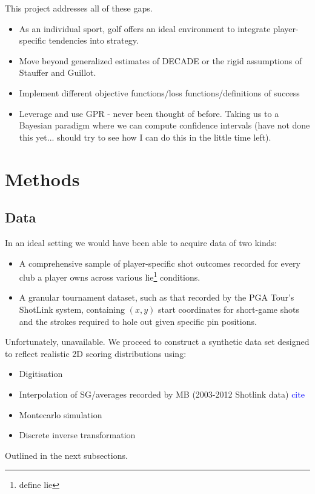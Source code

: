 \documentclass[11pt, letterpaper]{article}
\begin{document}
This project addresses all of these gaps.
\begin{itemize}
    \item As an individual sport, golf offers an ideal environment to integrate player-specific tendencies into strategy.
    \item Move beyond generalized estimates of DECADE or the rigid assumptions of Stauffer and Guillot.
    \item Implement different objective functions/loss functions/definitions of success
    \item Leverage and use GPR - never been thought of before. Taking us to a Bayesian paradigm where we can compute confidence intervals (have not done this yet... should try to see how I can do this in the little time left).
    
\end{itemize}

\section{Methods}
\subsection{Data}
In an ideal setting we would have been able to acquire data of two kinds:
\begin{itemize}
    \item A comprehensive sample of player-specific shot outcomes recorded for every club a player owns across various lie\footnote{define lie} conditions.
    \item A granular tournament dataset, such as that recorded by the PGA Tour's ShotLink system, containing $(x,y)$ start coordinates for short-game shots and the strokes required to hole out given specific pin positions.
\end{itemize}
Unfortunately, unavailable. We proceed to construct a synthetic data set designed to reflect realistic 2D scoring distributions using:
\begin{itemize}
    \item Digitisation
    \item Interpolation of SG/averages recorded by MB (2003-2012 Shotlink data) \textcolor{blue}{cite}
    \item Montecarlo simulation
    \item Discrete inverse transformation
\end{itemize}

Outlined in the next subsections.
\end{document}
